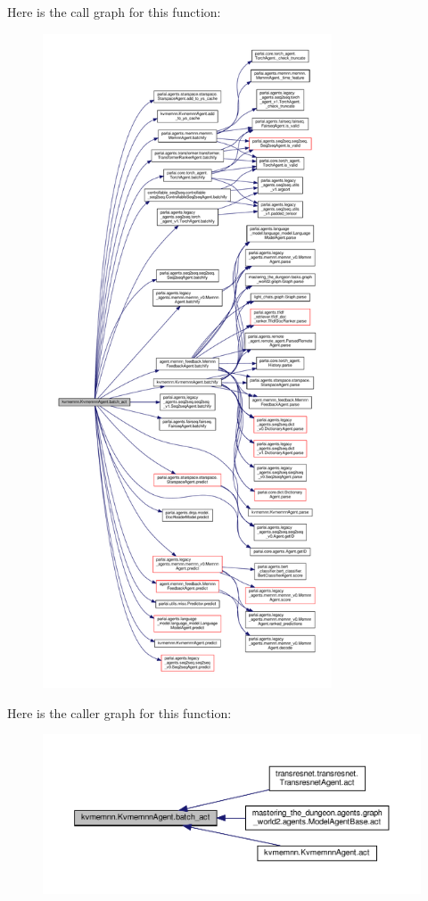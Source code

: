 Here is the call graph for this function\+:
\nopagebreak
\begin{figure}[H]
\begin{center}
\leavevmode
\includegraphics[height=550pt]{classkvmemnn_1_1KvmemnnAgent_a2a2c0f653125850d739b84e0c55e6796_cgraph}
\end{center}
\end{figure}
Here is the caller graph for this function\+:
\nopagebreak
\begin{figure}[H]
\begin{center}
\leavevmode
\includegraphics[width=350pt]{classkvmemnn_1_1KvmemnnAgent_a2a2c0f653125850d739b84e0c55e6796_icgraph}
\end{center}
\end{figure}
\mbox{\label{classkvmemnn_1_1KvmemnnAgent_ac7dba84c37dab7ef33f52d263fbdbdc7}} 

